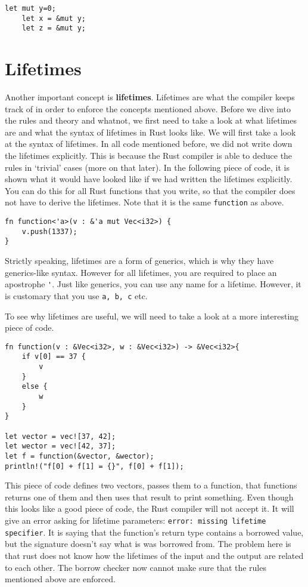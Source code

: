 \begin{verbatim}
let mut y=0;
	let x = &mut y; 
	let z = &mut y;
\end{verbatim}

\section{Lifetimes}
Another important concept is \textbf{lifetimes}. 
Lifetimes are what the compiler keeps track of in order to enforce the concepts mentioned above. Before we dive into the rules and theory and whatnot, we first need to take a look at what lifetimes are and what the syntax of lifetimes in Rust looks like. 
We will first take a look at the syntax of lifetimes. In all code mentioned before, we did not write down the lifetimes explicitly. This is because the Rust compiler is able to deduce the rules in `trivial' cases (more on that later). In the following piece of code, it is shown what it would have looked like if we had written the lifetimes explicitly. You can do this for all Rust functions that you write, so that the compiler does not have to derive the lifetimes. Note that it is the same \verb|function| as above. 

\begin{verbatim}
fn function<'a>(v : &'a mut Vec<i32>) {
    v.push(1337);
}
\end{verbatim}

Strictly speaking, lifetimes are a form of generics, which is why they have generics-like syntax.  However for all lifetimes, you are required to place an apostrophe \verb|'|. Just like generics, you can use any name for a lifetime. However, it is customary that you use \verb|a, b, c| etc. 

To see why lifetimes are useful, we will need to take a look at a more interesting piece of code. 

\begin{verbatim}
fn function(v : &Vec<i32>, w : &Vec<i32>) -> &Vec<i32>{
    if v[0] == 37 {
        v
    }
    else {
        w
    }
}

let vector = vec![37, 42];
let wector = vec![42, 37];
let f = function(&vector, &wector);
println!("f[0] + f[1] = {}", f[0] + f[1]);
\end{verbatim}

This piece of code defines two vectors, passes them to a function, that functions returns one of them and then uses that result to print something. Even though this looks like a good piece of code, the Rust compiler will not accept it. It will give an error asking for lifetime parameters: \texttt{error: missing lifetime specifier}. It is saying that the function's return type contains a borrowed value, but the signature doesn't say what is was borrowed from. The problem here is that rust does not know how the lifetimes of the input and the output are related to each other. The borrow checker now cannot make sure that the rules mentioned above are enforced. 

